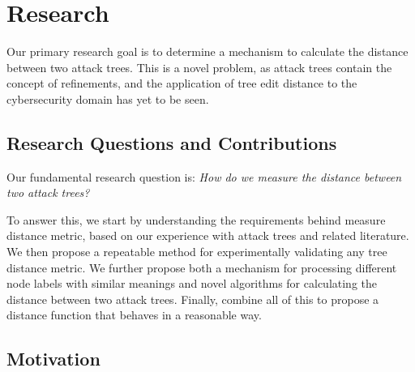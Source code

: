 
\section{Research}

Our primary research goal is to determine a mechanism to calculate the distance between two attack trees. This is a novel problem, as attack trees contain the concept of refinements, and the application of tree edit distance to the cybersecurity domain has yet to be seen.

\subsection{Research Questions and Contributions}


Our fundamental research question is: \emph{How do we measure the distance between two attack trees?}

To answer this, we start by understanding the requirements behind measure distance metric, based on our experience with attack trees and related literature. We then propose a repeatable method for experimentally validating any tree distance metric. We further propose both a mechanism for processing different node labels with similar meanings and novel algorithms for calculating the distance between two attack trees. Finally, combine all of this to propose a distance function that behaves in a reasonable way.




\subsection{Motivation}

